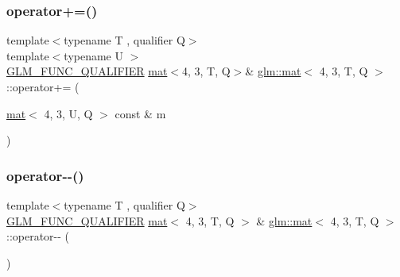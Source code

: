 \mbox{\label{structglm_1_1mat_3_014_00_013_00_01_t_00_01_q_01_4_aef2c1c92ecc7a7780ef06345d516a8ef}} 
\subsubsection{\texorpdfstring{operator+=()}{operator+=()}\hspace{0.1cm}{\footnotesize\ttfamily [4/4]}}
{\footnotesize\ttfamily template$<$typename T , qualifier Q$>$ \\
template$<$typename U $>$ \\
\mbox{\hyperlink{setup_8hpp_a33fdea6f91c5f834105f7415e2a64407}{G\+L\+M\+\_\+\+F\+U\+N\+C\+\_\+\+Q\+U\+A\+L\+I\+F\+I\+ER}} \mbox{\hyperlink{structglm_1_1mat}{mat}}$<$4, 3, T, Q$>$\& \mbox{\hyperlink{structglm_1_1mat}{glm\+::mat}}$<$ 4, 3, T, Q $>$\+::operator+= (\begin{DoxyParamCaption}\item[{\mbox{\hyperlink{structglm_1_1mat}{mat}}$<$ 4, 3, U, Q $>$ const \&}]{m }\end{DoxyParamCaption})}

\mbox{\label{structglm_1_1mat_3_014_00_013_00_01_t_00_01_q_01_4_aaa6df2edca16cfac23a2806f2fd8ae61}} 
\subsubsection{\texorpdfstring{operator-\/-\/()}{operator--()}\hspace{0.1cm}{\footnotesize\ttfamily [1/2]}}
{\footnotesize\ttfamily template$<$typename T , qualifier Q$>$ \\
\mbox{\hyperlink{setup_8hpp_a33fdea6f91c5f834105f7415e2a64407}{G\+L\+M\+\_\+\+F\+U\+N\+C\+\_\+\+Q\+U\+A\+L\+I\+F\+I\+ER}} \mbox{\hyperlink{structglm_1_1mat}{mat}}$<$ 4, 3, T, Q $>$ \& \mbox{\hyperlink{structglm_1_1mat}{glm\+::mat}}$<$ 4, 3, T, Q $>$\+::operator-\/-\/ (\begin{DoxyParamCaption}{ }\end{DoxyParamCaption})}

